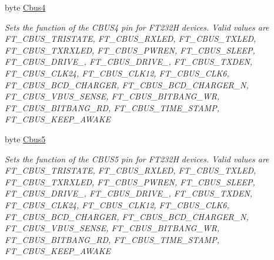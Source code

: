 \begin{DoxyCompactItemize}
byte \mbox{\hyperlink{class_f_t_d2_x_x___n_e_t_1_1_f_t_d_i_1_1_f_t___x_s_e_r_i_e_s___e_e_p_r_o_m___s_t_r_u_c_t_u_r_e_a7a06ac3141e2bee548b1e3c869222809}{Cbus4}}
\begin{DoxyCompactList}\small\item\em Sets the function of the C\+B\+U\+S4 pin for F\+T232H devices. Valid values are F\+T\+\_\+\+C\+B\+U\+S\+\_\+\+T\+R\+I\+S\+T\+A\+TE, F\+T\+\_\+\+C\+B\+U\+S\+\_\+\+R\+X\+L\+ED, F\+T\+\_\+\+C\+B\+U\+S\+\_\+\+T\+X\+L\+ED, F\+T\+\_\+\+C\+B\+U\+S\+\_\+\+T\+X\+R\+X\+L\+ED, F\+T\+\_\+\+C\+B\+U\+S\+\_\+\+P\+W\+R\+EN, F\+T\+\_\+\+C\+B\+U\+S\+\_\+\+S\+L\+E\+EP, F\+T\+\_\+\+C\+B\+U\+S\+\_\+\+D\+R\+I\+V\+E\+\_, F\+T\+\_\+\+C\+B\+U\+S\+\_\+\+D\+R\+I\+V\+E\+\_, F\+T\+\_\+\+C\+B\+U\+S\+\_\+\+T\+X\+D\+EN, F\+T\+\_\+\+C\+B\+U\+S\+\_\+\+C\+L\+K24, F\+T\+\_\+\+C\+B\+U\+S\+\_\+\+C\+L\+K12, F\+T\+\_\+\+C\+B\+U\+S\+\_\+\+C\+L\+K6, F\+T\+\_\+\+C\+B\+U\+S\+\_\+\+B\+C\+D\+\_\+\+C\+H\+A\+R\+G\+ER, F\+T\+\_\+\+C\+B\+U\+S\+\_\+\+B\+C\+D\+\_\+\+C\+H\+A\+R\+G\+E\+R\+\_\+N, F\+T\+\_\+\+C\+B\+U\+S\+\_\+\+V\+B\+U\+S\+\_\+\+S\+E\+N\+SE, F\+T\+\_\+\+C\+B\+U\+S\+\_\+\+B\+I\+T\+B\+A\+N\+G\+\_\+\+WR, F\+T\+\_\+\+C\+B\+U\+S\+\_\+\+B\+I\+T\+B\+A\+N\+G\+\_\+\+RD, F\+T\+\_\+\+C\+B\+U\+S\+\_\+\+T\+I\+M\+E\+\_\+\+S\+T\+A\+MP, F\+T\+\_\+\+C\+B\+U\+S\+\_\+\+K\+E\+E\+P\+\_\+\+A\+W\+A\+KE \end{DoxyCompactList}\item 
byte \mbox{\hyperlink{class_f_t_d2_x_x___n_e_t_1_1_f_t_d_i_1_1_f_t___x_s_e_r_i_e_s___e_e_p_r_o_m___s_t_r_u_c_t_u_r_e_ae7f0c9b8213978825d452e2c0ecf6da6}{Cbus5}}
\begin{DoxyCompactList}\small\item\em Sets the function of the C\+B\+U\+S5 pin for F\+T232H devices. Valid values are F\+T\+\_\+\+C\+B\+U\+S\+\_\+\+T\+R\+I\+S\+T\+A\+TE, F\+T\+\_\+\+C\+B\+U\+S\+\_\+\+R\+X\+L\+ED, F\+T\+\_\+\+C\+B\+U\+S\+\_\+\+T\+X\+L\+ED, F\+T\+\_\+\+C\+B\+U\+S\+\_\+\+T\+X\+R\+X\+L\+ED, F\+T\+\_\+\+C\+B\+U\+S\+\_\+\+P\+W\+R\+EN, F\+T\+\_\+\+C\+B\+U\+S\+\_\+\+S\+L\+E\+EP, F\+T\+\_\+\+C\+B\+U\+S\+\_\+\+D\+R\+I\+V\+E\+\_, F\+T\+\_\+\+C\+B\+U\+S\+\_\+\+D\+R\+I\+V\+E\+\_, F\+T\+\_\+\+C\+B\+U\+S\+\_\+\+T\+X\+D\+EN, F\+T\+\_\+\+C\+B\+U\+S\+\_\+\+C\+L\+K24, F\+T\+\_\+\+C\+B\+U\+S\+\_\+\+C\+L\+K12, F\+T\+\_\+\+C\+B\+U\+S\+\_\+\+C\+L\+K6, F\+T\+\_\+\+C\+B\+U\+S\+\_\+\+B\+C\+D\+\_\+\+C\+H\+A\+R\+G\+ER, F\+T\+\_\+\+C\+B\+U\+S\+\_\+\+B\+C\+D\+\_\+\+C\+H\+A\+R\+G\+E\+R\+\_\+N, F\+T\+\_\+\+C\+B\+U\+S\+\_\+\+V\+B\+U\+S\+\_\+\+S\+E\+N\+SE, F\+T\+\_\+\+C\+B\+U\+S\+\_\+\+B\+I\+T\+B\+A\+N\+G\+\_\+\+WR, F\+T\+\_\+\+C\+B\+U\+S\+\_\+\+B\+I\+T\+B\+A\+N\+G\+\_\+\+RD, F\+T\+\_\+\+C\+B\+U\+S\+\_\+\+T\+I\+M\+E\+\_\+\+S\+T\+A\+MP, F\+T\+\_\+\+C\+B\+U\+S\+\_\+\+K\+E\+E\+P\+\_\+\+A\+W\+A\+KE \end{DoxyCompactList}\item 

\end{DoxyCompactItemize}
